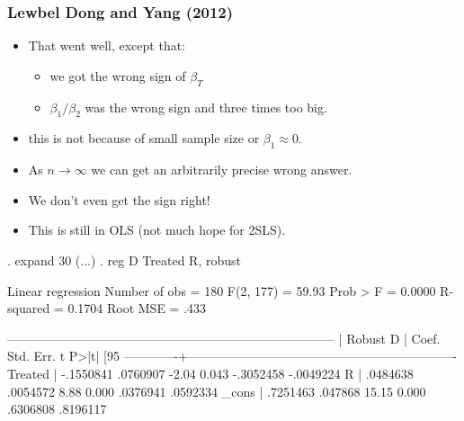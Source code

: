 \documentclass[11pt,dvipsnames,table,aspectratio=169]{beamer}
\begin{document}
\begin{frame}[fragile]
\frametitle{Lewbel Dong and Yang (2012)}
\begin{itemize}
\item That went well, except that:
\begin{itemize}
\item we got the wrong sign of $\beta_T$
\item $\beta_1/\beta_2$ was the wrong sign and three times too big.
\end{itemize}
\item this is not because of small sample size or $\beta_1 \approx 0$.
\item As $n \rightarrow \infty$ we can get an arbitrarily precise wrong answer.
\item We don't even get the sign right!
\item This is still in OLS (not much hope for 2SLS).
\end{itemize}
\tiny
\begin{semiverbatim}
. expand 30
(...)
. reg D Treated R, robust

Linear regression                               Number of obs     =        180
                                          F(2, 177)         =      59.93
                                          Prob > F          =     0.0000
                                          R-squared         =     0.1704
                                          Root MSE          =       .433

------------------------------------------------------------------------------
       |               Robust
       D |      Coef.   Std. Err.      t    P>|t|     [95%
-------------+----------------------------------------------------------------
Treated |  -.1550841   .0760907    -2.04   0.043    -.3052458   -.0049224
       R |   .0484638   .0054572     8.88   0.000     .0376941    .0592334
_cons |   .7251463    .047868    15.15   0.000     .6306808    .8196117
\end{semiverbatim}
\end{frame}
\end{document}
